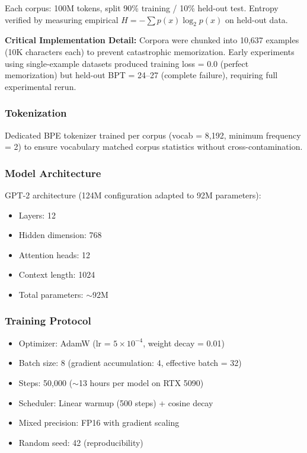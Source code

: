 \documentclass[11pt,a4paper]{article}
\begin{document}
Each corpus: 100M tokens, split 90\% training / 10\% held-out test. Entropy verified by measuring empirical $H = -\sum p(x) \log_2 p(x)$ on held-out data.

\textbf{Critical Implementation Detail:} Corpora were chunked into 10,637 examples (10K characters each) to prevent catastrophic memorization. Early experiments using single-example datasets produced training loss = 0.0 (perfect memorization) but held-out BPT = 24--27 (complete failure), requiring full experimental rerun.

\subsubsection{Tokenization}

Dedicated BPE tokenizer trained per corpus (vocab = 8,192, minimum frequency = 2) to ensure vocabulary matched corpus statistics without cross-contamination.

\subsubsection{Model Architecture}

GPT-2 architecture (124M configuration adapted to 92M parameters):
\begin{itemize}
\item Layers: 12
\item Hidden dimension: 768
\item Attention heads: 12
\item Context length: 1024
\item Total parameters: $\sim$92M
\end{itemize}

\subsubsection{Training Protocol}

\begin{itemize}
\item Optimizer: AdamW (lr = $5 \times 10^{-4}$, weight decay = 0.01)
\item Batch size: 8 (gradient accumulation: 4, effective batch = 32)
\item Steps: 50,000 ($\sim$13 hours per model on RTX 5090)
\item Scheduler: Linear warmup (500 steps) + cosine decay
\item Mixed precision: FP16 with gradient scaling
\item Random seed: 42 (reproducibility)
\end{itemize}
\end{document}

